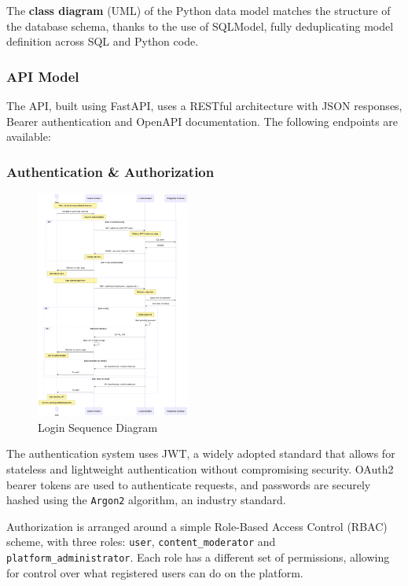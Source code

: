 \documentclass[11pt,italian,a4paper]{article}
\begin{document}
The \textbf{class diagram} (UML) of the Python data model matches the structure of the database schema, thanks to the use of SQLModel, fully deduplicating model definition across SQL and Python code.

\subsubsection{API Model}

The API, built using FastAPI, uses a RESTful architecture with JSON responses, Bearer authentication and OpenAPI documentation. The following endpoints are available:



\subsubsection{Authentication \& Authorization}
\label{sec:auth}

\begin{figure}
    \centering
    \includegraphics[width=0.45\textwidth]{figures/login_sequence.png}
    \caption{Login Sequence Diagram}
\end{figure}

The authentication system uses JWT, a widely adopted standard that allows for stateless and lightweight authentication without compromising security. OAuth2 bearer tokens are used to authenticate requests, and passwords are securely hashed using the \texttt{Argon2} algorithm, an industry standard.

Authorization is arranged around a simple Role-Based Access Control (RBAC) scheme, with three roles: \texttt{user}, \texttt{content\_moderator} and \texttt{platform\_administrator}. Each role has a different set of permissions, allowing for control over what registered users can do on the platform.
\end{document}
